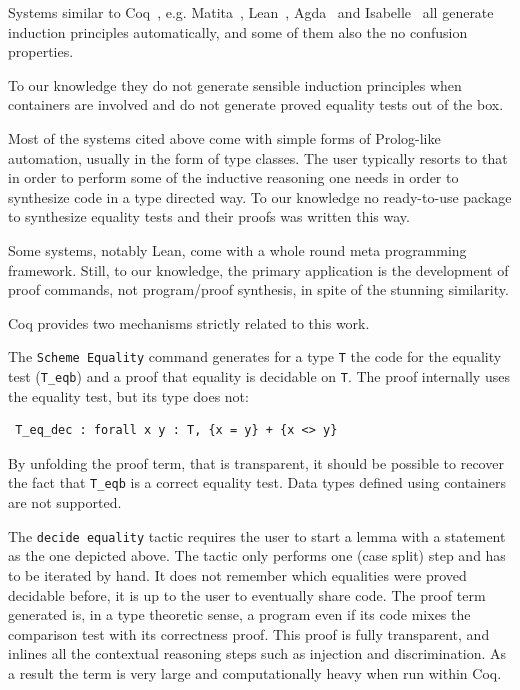 \documentclass[sigplan,10pt,review]{acmart}\settopmatter{printfolios=true,printccs=false,printacmref=false}
\begin{document}
Systems similar to Coq~\cite{the_coq_development_team_2018_1219885},
e.g. Matita~\cite{10.1007/978-3-642-22438-6_7},
Lean~\cite{10.1007/978-3-319-21401-6_26}, Agda~\cite{norell:thesis} and
Isabelle~\cite{Nipkow:2002:IPA:1791547} all generate
induction principles automatically, and some of them also the
no confusion properties. 

To our knowledge they do not generate sensible induction principles
when containers are involved and do not generate proved equality tests
out of the box.

Most of the systems cited above come with simple forms of Prolog-like
automation, usually in the form of type classes. The user typically
resorts to that in order to perform some of the inductive reasoning
one needs in order to synthesize code in a type directed way.
To our knowledge no ready-to-use package to synthesize equality tests
and their proofs was written this way.

Some systems, notably Lean, come with a whole round meta programming 
framework. Still, to our knowledge, the primary application is the
development of proof commands, not program/proof synthesis, in spite
of the stunning similarity.

Coq provides two mechanisms strictly related to this work.

The \lstinline+Scheme Equality+ command generates for a type
\lstinline+T+ the code for the equality test (\lstinline+T_eqb+) 
and a proof that equality is decidable on \lstinline+T+. The proof
internally uses the equality test, but its type does not:

\begin{minipage}{\textwidth}\begin{lstlisting}
 T_eq_dec : forall x y : T, {x = y} + {x <> y}
\end{lstlisting}\end{minipage}

\noindent
By unfolding the proof term, that is transparent, it should be
possible to recover the fact that \lstinline+T_eqb+ is a correct
equality test. Data types defined using containers are not supported.

The \lstinline+decide equality+ tactic requires the user to start
a lemma with a statement as the one depicted above.
The tactic only performs one (case split) step and has to
be iterated by hand. It does not remember which equalities were
proved decidable before, it is up to the user to eventually share code.
The proof term generated is, in a type theoretic sense, a program
even if its code mixes the comparison test with its correctness proof.
This proof is fully transparent, and inlines all the contextual
reasoning steps such as injection and discrimination. As a result the
term is very large and computationally heavy when run within Coq.
\end{document}
